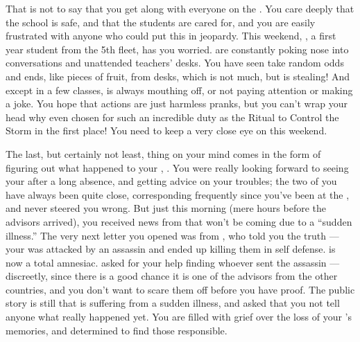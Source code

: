 \documentclass[char]{GL2020}
\begin{document}
That is not to say that you get along with everyone on the \pShip{}. You care deeply that the school is safe, and that the students are cared for, and you are easily frustrated with anyone who could put this in jeopardy. This weekend, \cPirateChild{\full}, a first year student from the 5th fleet, has you worried. \cPirateChild{\They} are constantly poking \cPirateChild{\their} nose into conversations and unattended teachers’ desks. You have seen \cPirateChild{\them} take random odds and ends, like pieces of fruit, from desks, which is not much, but is stealing! And except in a few classes, \cPirateChild{} is always mouthing off, or not paying attention or making a joke. You hope that \cPirateChild{\their} actions are just harmless pranks, but you can’t wrap your head why \cPirateChild{\they} \cPirateChild{\were} even chosen for such an incredible duty as the Ritual to Control the Storm in the first place! You need to keep a very close eye on \cPirateChild{\them} this weekend.

The last, but certainly not least, thing on your mind comes in the form of figuring out what happened to your \cHeadDiplomat{\auncle}, \cHeadDiplomat{}. You were really looking forward to seeing your \cHeadDiplomat{\auncle} after a long absence, and getting \cHeadDiplomat{\their} advice on your troubles; the two of you have always been quite close, corresponding frequently since you’ve been at the \pSc{}, and \cHeadDiplomat{\they} never steered you wrong. But just this morning (mere hours before the advisors arrived), you received news from \cEbbPriest{\full} that \cHeadDiplomat{} won't be coming due to a ``sudden illness.'' The very next letter you opened was from \cJuniorStatesman{}, who told you the truth — your \cHeadDiplomat{\auncle} was attacked by an assassin and ended up killing them in self defense. \cHeadDiplomat{} is now a total amnesiac. \cJuniorStatesman{} asked for your help finding whoever sent the assassin — discreetly, since there is a good chance it is one of the advisors from the other countries, and you don't want to scare them off before you have proof. The public story is still that \cHeadDiplomat{} is suffering from a sudden illness, and \cJuniorStatesman{} asked that you not tell anyone what really happened yet. You are filled with grief over the loss of your \cHeadDiplomat{\auncle}'s memories, and determined to find those responsible. 
\end{document}
